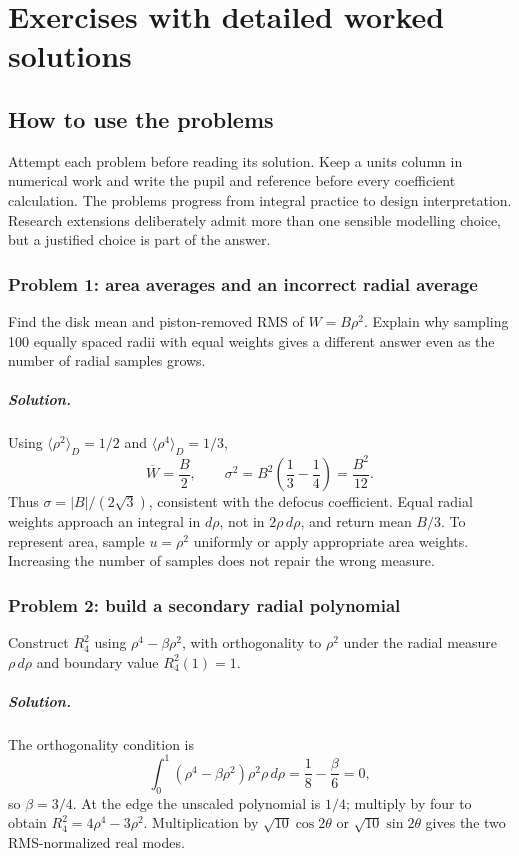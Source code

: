\chapter{Exercises with detailed worked solutions}
\label{zc:exercises}

\section{How to use the problems}
Attempt each problem before reading its solution. Keep a units column
in numerical work and write the pupil and reference before every
coefficient calculation. The problems progress from integral practice
to design interpretation. Research extensions deliberately admit more
than one sensible modelling choice, but a justified choice is part
of the answer.

\subsection*{Problem 1: area averages and an incorrect radial average}
Find the disk mean and piston-removed RMS of $W=B\rho^2$. Explain why
sampling 100 equally spaced radii with equal weights gives a different
answer even as the number of radial samples grows.

\paragraph{Solution.}
Using $\langle\rho^2\rangle_D=1/2$ and
$\langle\rho^4\rangle_D=1/3$,
\begin{equation}
 \overline W=\frac B2,\qquad
 \sigma^2=B^2\left(\frac13-\frac14\right)=\frac{B^2}{12}.
\end{equation}
Thus $\sigma=|B|/(2\sqrt3)$, consistent with the defocus coefficient.
Equal radial weights approach an integral in $d\rho$, not in
$2\rho\,d\rho$, and return mean $B/3$. To represent area, sample
$u=\rho^2$ uniformly or apply appropriate area weights. Increasing
the number of samples does not repair the wrong measure.

\subsection*{Problem 2: build a secondary radial polynomial}
Construct $R_4^2$ using $\rho^4-\beta\rho^2$, with orthogonality to
$\rho^2$ under the radial measure $\rho\,d\rho$ and boundary value
$R_4^2(1)=1$.

\paragraph{Solution.}
The orthogonality condition is
\begin{equation}
 \int_0^1(\rho^4-\beta\rho^2)\rho^2\rho\,d\rho
      =\frac18-\frac\beta6=0,
\end{equation}
so $\beta=3/4$. At the edge the unscaled polynomial is $1/4$;
multiply by four to obtain $R_4^2=4\rho^4-3\rho^2$.
Multiplication by $\sqrt{10}\cos2\theta$ or
$\sqrt{10}\sin2\theta$ gives the two RMS-normalized real modes.


